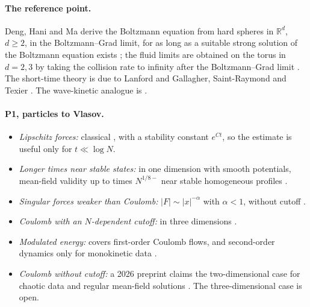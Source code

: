 \documentclass[11pt]{article}
\theoremstyle{definition}
\begin{document}
\paragraph{The reference point.} Deng, Hani and Ma derive the Boltzmann
equation from hard spheres in $\mathbb{R}^d$, $d\ge 2$, in the Boltzmann--Grad
limit, for as long as a suitable strong solution of the Boltzmann equation
exists \cite{DHM1}; the fluid limits are obtained on the torus in $d=2,3$ by
taking the collision rate to infinity after the Boltzmann--Grad limit
\cite{DHM2}. The short-time theory is due to Lanford \cite{Lanford} and
Gallagher, Saint-Raymond and Texier \cite{GST}. The wave-kinetic analogue is
\cite{DH-WKE,DH-long}.

\paragraph{P1, particles to Vlasov.}
\begin{itemize}
  \item \emph{Lipschitz forces:} classical \cite{BraunHepp,Dobrushin}, with a
    stability constant $e^{Ct}$, so the estimate is useful only for
    $t \ll \log N$.
  \item \emph{Longer times near stable states:} in one dimension with
    smooth potentials, mean-field validity up to times $N^{1/8-}$ near
    stable homogeneous profiles \cite{CagliotiRousset}.
  \item \emph{Singular forces weaker than Coulomb:} $|F|\sim |x|^{-\alpha}$
    with $\alpha < 1$, without cutoff \cite{HaurayJabin}.
  \item \emph{Coulomb with an $N$-dependent cutoff:} in three dimensions
    \cite{LazaroviciPickl}.
  \item \emph{Modulated energy:} covers first-order Coulomb flows, and
    second-order dynamics only for monokinetic data \cite{Serfaty}.
  \item \emph{Coulomb without cutoff:} a 2026 preprint claims the
    two-dimensional case for chaotic data and regular mean-field solutions
    \cite{DuerinckxJabin}. The three-dimensional case is open.
\end{itemize}
\end{document}
